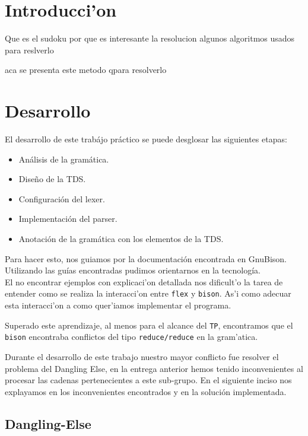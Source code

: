 \documentclass[a4paper,spanish]{article}
\begin{document}




\section{Introducci'on}
Que es el sudoku
por que es interesante la resolucion
algunos algoritmos usados para reslverlo


aca se presenta este metodo qpara resolverlo
\section{Desarrollo}

El desarrollo de este trab\'ajo pr\'actico se puede desglosar las siguientes etapas:
\begin{itemize}
    \item An\'alisis de la gram\'atica.
    \item Dise\~no de la TDS.
    \item Configuraci\'on del lexer.
    \item Implementaci\'on del parser.
    \item Anotaci\'on de la gram\'atica con los elementos de la TDS.
\end{itemize}

Para hacer esto, nos guiamos por la documentaci\'on encontrada en GnuBison. Utilizando las gu\'ias encontradas pudimos orientarnos en la tecnolog\'ia. \\

El no encontrar ejemplos con explicaci'on detallada nos dificult'o la tarea de entender como se realiza la interacci'on entre \texttt{flex} y \texttt{bison}. As'i como adecuar esta interacci'on a como quer'iamos implementar el programa.

Superado este aprendizaje, al menos para el alcance del \texttt{TP}, encontramos que el \texttt{bison} encontraba conflictos del tipo \texttt{reduce/reduce} en la gram'atica.

Durante el desarrollo de este trabajo nuestro mayor conflicto fue resolver el problema del Dangling Else, en la entrega anterior hemos tenido inconvenientes al procesar las cadenas pertenecientes a este sub-grupo. En el siguiente inciso nos explayamos en los inconvenientes encontrados y en la soluci\'on implementada.

\subsection{Dangling-Else}
\end{document}
